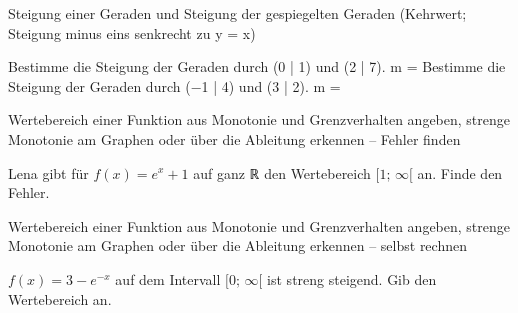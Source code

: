 \begin{aufgabe}{Steigung einer Geraden und Steigung der gespiegelten Geraden (Kehrwert; Steigung minus eins senkrecht zu y = x)}
\begin{teile}
\teil Bestimme die Steigung der Geraden durch (0 | 1) und (2 | 7). m = \leerfeld
\teil Bestimme die Steigung der Geraden durch (−1 | 4) und (3 | 2). m = \leerfeld
\end{teile}
\end{aufgabe}

\begin{aufgabe}{Wertebereich einer Funktion aus Monotonie und Grenzverhalten angeben, strenge Monotonie am Graphen oder über die Ableitung erkennen – Fehler finden}
\begin{teile}
\teil Lena gibt für $f(x) = e^x + 1$ auf ganz ℝ den Wertebereich $[1;\, \infty[$ an. Finde den Fehler.
\end{teile}
\end{aufgabe}

\begin{aufgabe}{Wertebereich einer Funktion aus Monotonie und Grenzverhalten angeben, strenge Monotonie am Graphen oder über die Ableitung erkennen – selbst rechnen}
\begin{teile}
\teil $f(x) = 3 - e^{-x}$ auf dem Intervall $[0;\, \infty[$ ist streng steigend. Gib den Wertebereich an.
\end{teile}
\end{aufgabe}
